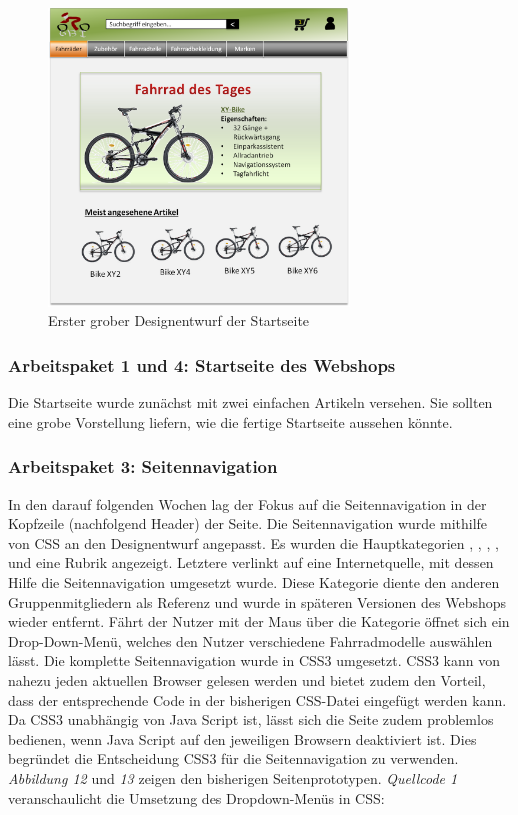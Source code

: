 \begin{figure}[H]
\begin{center}
\includegraphics[width=8cm]{Bilder/Abbildung2-GroberDesignEntwurfDesWebshops.png}
\end{center}
\caption{Erster grober Designentwurf der Startseite}
\end{figure}


\subsubsection{Arbeitspaket 1 und 4: Startseite des Webshops}

Die Startseite wurde zunächst mit zwei einfachen Artikeln versehen. Sie sollten eine grobe Vorstellung liefern, wie die fertige Startseite aussehen könnte.

\subsubsection{Arbeitspaket 3: Seitennavigation}

In den darauf folgenden Wochen lag der Fokus auf die Seitennavigation in der Kopfzeile (nachfolgend Header) der Seite. Die Seitennavigation wurde mithilfe von CSS an den Designentwurf angepasst. Es wurden die Hauptkategorien \grqq{}, \grqq{}, \grqq{}, \grqq{}, \grqq{} und eine Rubrik \grqq{} angezeigt. Letztere verlinkt auf eine Internetquelle, mit dessen Hilfe die Seitennavigation umgesetzt wurde. Diese Kategorie diente den anderen Gruppenmitgliedern als Referenz und wurde in späteren Versionen des Webshops wieder entfernt. Fährt der Nutzer mit der Maus über die Kategorie \grqq{} öffnet sich ein Drop-Down-Menü, welches den Nutzer verschiedene Fahrradmodelle auswählen lässt. Die komplette Seitennavigation wurde in CSS3 umgesetzt. CSS3 kann von nahezu jeden aktuellen Browser gelesen werden und bietet zudem den Vorteil, dass der entsprechende Code in der bisherigen CSS-Datei eingefügt werden kann. Da CSS3 unabhängig von Java Script ist, lässt sich die Seite zudem problemlos bedienen, wenn Java Script auf den jeweiligen Browsern deaktiviert ist. Dies begründet die Entscheidung CSS3 für die Seitennavigation zu verwenden.
\\
\textit{Abbildung 12} und \textit{13} zeigen den bisherigen Seitenprototypen. \textit{Quellcode 1} veranschaulicht die Umsetzung des Dropdown-Menüs in CSS:

